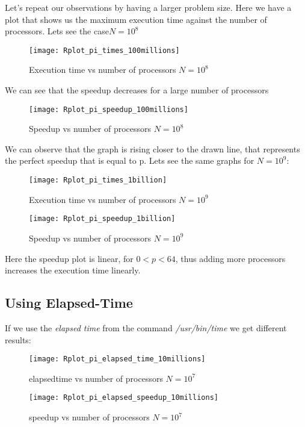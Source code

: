 \documentclass[11pt]{scrartcl} %
\begin{document}
Let's repeat our observations by having a larger problem size.
Here we have a plot that shows us the maximum execution time against the number of processors. Lets see the case$ N=10^8$
\begin{figure}[H] %
	\centering
	\texttt{[image: Rplot\_pi\_times\_100millions]} %
	\caption{Execution time vs number of processors $N= 10^8$}
\end{figure}
We can see that the speedup  decreases for a large number of processors
\begin{figure}[H] %
	\centering
	\texttt{[image: Rplot\_pi\_speedup\_100millions]} %
	\caption{Speedup vs number of processors $N=10^8$}
\end{figure}
We can observe that the graph is rising closer to the drawn line, that represents the perfect speedup that is equal to p.
Lets see the same graphs for $N=10^9$:
\begin{figure}[H] %
	\centering
	\texttt{[image: Rplot\_pi\_times\_1billion]} %
	\caption{ Execution time vs number of processors $N= 10^9$}
\end{figure}
\begin{figure}[H] %
	\centering
	\texttt{[image: Rplot\_pi\_speedup\_1billion]} %
	\caption{ Speedup vs number of processors $N= 10^9$}
\end{figure}
Here the speedup plot is linear, for $0<p<64$, thus adding more processors increases the execution time linearly.
\subsection{Using Elapsed-Time}
If we use the \textit{elapsed time}  from the command \textit{/usr/bin/time} we get different results:

\begin{figure}[H] %
	\centering
	\texttt{[image: Rplot\_pi\_elapsed\_time\_10millions]} %
	\caption{elapsedtime vs number of processors $N= 10^7$}
\end{figure}
\begin{figure}[H] %
	\centering
	\texttt{[image: Rplot\_pi\_elapsed\_speedup\_10millions]} %
	\caption{speedup vs number of processors $N= 10^7$}
\end{figure}
\end{document}
